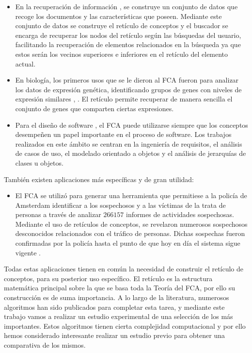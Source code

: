 \documentclass[oneside,openright,titlepage,numbers=noenddot,openany,headinclude,footinclude=true,
cleardoublepage=empty,abstractoff,BCOR=5mm,paper=a4,fontsize=12pt,main=spanish]{scrreprt}
\begin{document}
\begin{itemize}
    \item En la recuperación de información \cite{inforetrieval}, se construye un conjunto de datos que recoge los documentos y las características que poseen. Mediante este conjunto de datos se construye el retículo de conceptos y el buscador se encarga de recuperar los nodos del retículo según las búsquedas del usuario, facilitando la recuperación de elementos relacionados en la búsqueda ya que estos serán los vecinos superiores e inferiores en el retículo del elemento actual.
    
    \item En biología, los primeros usos que se le dieron al FCA fueron para analizar los datos de expresión genética, identificando grupos de genes con niveles de expresión similares \cite{biologia1}, \cite{biologia2}. El retículo permite recuperar de manera sencilla el conjunto de genes que comparten ciertas expresiones.
    
    \item Para el diseño de software \cite{softwa}, el FCA puede utilizarse siempre que los conceptos desempeñen un papel importante en el proceso de software. Los trabajos realizados en este ámbito se centran en la ingeniería de requisitos, el análisis de casos de uso, el modelado orientado a objetos y  el análisis de jerarquías de clases u objetos.
\end{itemize}

También existen aplicaciones más específicas y de gran utilidad:

\begin{itemize}
    \item El FCA se utilizó para generar una herramienta que permitiese a la policía de Amsterdam identificar a los sospechosos y a las víctimas de la trata de personas a través de analizar $266157$ informes de actividades sospechosas. Mediante el uso de retículos de conceptos, se revelaron numerosos sospechosos desconocidos relacionados con el tráfico de personas. Dichas sospechas fueron confirmadas por la policía hasta el punto de que hoy en día el sistema sigue vigente \cite{sospecius}.
\end{itemize}

Todas estas aplicaciones tienen en común la necesidad de construir el retículo de conceptos, para su posterior uso específico. El retículo es la estructura matemática principal sobre la que se basa toda la Teoría del FCA, por ello su construcción es de suma importancia. A lo largo de la literatura, numerosos algoritmos han sido publicados para completar esta tarea, y mediante este trabajo vamos a realizar un estudio experimental de una selección de los más importantes. Estos algoritmos tienen cierta complejidad computacional y por ello hemos considerado interesante realizar un estudio previo para obtener una comparativa de los mismos.
\end{document}

